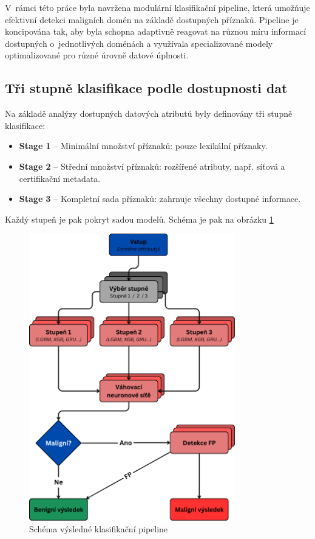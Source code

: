 V~rámci této práce byla navržena modulární klasifikační pipeline, která umožňuje efektivní detekci maligních domén na základě dostupných příznaků. Pipeline je koncipována tak, aby byla schopna adaptivně reagovat na různou míru informací dostupných o~jednotlivých doménách a využívala specializované modely optimalizované pro různé úrovně datové úplnosti.

\subsection{Tři stupně klasifikace podle dostupnosti dat}

Na základě analýzy dostupných datových atributů byly definovány tři stupně klasifikace:

\begin{itemize}
    \item \textbf{Stage 1} – Minimální množství příznaků: pouze lexikální příznaky. 
    \item \textbf{Stage 2} – Střední množství příznaků: rozšířené atributy, např. síťová a certifikační metadata.
    \item \textbf{Stage 3} – Kompletní sada příznaků: zahrnuje všechny dostupné informace. 
\end{itemize}

Každý stupeň je pak pokryt sadou modelů. Schéma je pak na obrázku \ref{fig:classification_pipeline_ensemble}

\begin{figure}[h]
    \centering
    \includegraphics[width=0.8\textwidth]{obrazky-figures/pipeline_final.png}
    \caption{Schéma výsledné klasifikační pipeline}
    \label{fig:classification_pipeline_ensemble}
\end{figure}

